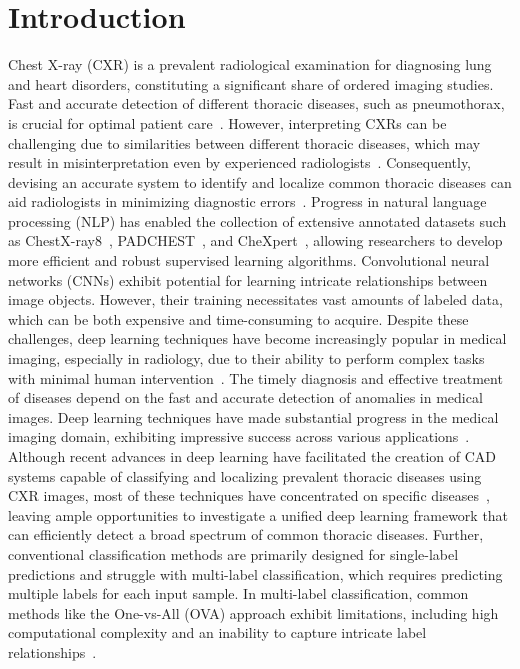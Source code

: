 \section{Introduction}\label{sec:taxonomy.introduction}
Chest X-ray (CXR) is a prevalent radiological examination for diagnosing lung and heart disorders, constituting a significant share of ordered imaging studies. Fast and accurate detection of different thoracic diseases, such as pneumothorax, is crucial for optimal patient care~\cite{bellaviti_Increased_2016}. However, interpreting CXRs can be challenging due to similarities between different thoracic diseases, which may result in misinterpretation even by experienced radiologists~\cite{delrue_Difficulties_2011}. Consequently, devising an accurate system to identify and localize common thoracic diseases can aid radiologists in minimizing diagnostic errors~\cite{crisp_Global_2014,silverstein_Most_2016}.
Progress in natural language processing (NLP) has enabled the collection of extensive annotated datasets such as ChestX-ray8~\cite{wang_ChestXRay8_2017}, PADCHEST~\cite{bustos_Padchest_2020}, and CheXpert~\cite{irvin_CheXpert_2019}, allowing researchers to develop more efficient and robust supervised learning algorithms.
Convolutional neural networks (CNNs) exhibit potential for learning intricate relationships between image objects. However, their training necessitates vast amounts of labeled data, which can be both expensive and time-consuming to acquire. Despite these challenges, deep learning techniques have become increasingly popular in medical imaging, especially in radiology, due to their ability to perform complex tasks with minimal human intervention~\cite{jaderberg_Spatial_2015}.
The timely diagnosis and effective treatment of diseases depend on the fast and accurate detection of anomalies in medical images. Deep learning techniques have made substantial progress in the medical imaging domain, exhibiting impressive success across various applications~\cite{litjens_Survey_2017a,eshghali_Machine_2023}.  Although recent advances in deep learning have facilitated the creation of CAD systems capable of classifying and localizing prevalent thoracic diseases using CXR images, most of these techniques have concentrated on specific diseases~\cite{jaiswal_Identifying_2019,lakhani_Deep_2017,pasa_Efficient_2019,ausawalaithong_Automatic_2018}, leaving ample opportunities to investigate a unified deep learning framework that can efficiently detect a broad spectrum of common thoracic diseases. Further, conventional classification methods are primarily designed for single-label predictions and struggle with multi-label classification, which requires predicting multiple labels for each input sample. In multi-label classification, common methods like the One-vs-All (OVA) approach exhibit limitations, including high computational complexity and an inability to capture intricate label relationships~\cite{tsoumakas_MultiLabel_2007}.
